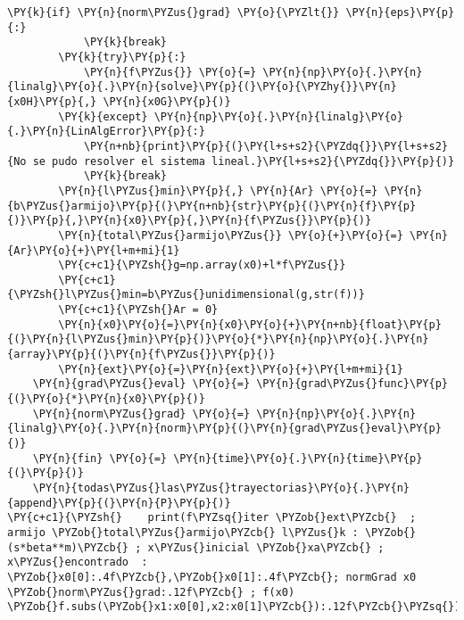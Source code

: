 \begin{itemize}
\begin{tcolorbox}[breakable, size=fbox, boxrule=1pt, pad at break*=1mm,colback=cellbackground, colframe=cellborder]
\begin{Verbatim}[commandchars=\\\{\}]
        \PY{k}{if} \PY{n}{norm\PYZus{}grad} \PY{o}{\PYZlt{}} \PY{n}{eps}\PY{p}{:}
            \PY{k}{break}
        \PY{k}{try}\PY{p}{:}
            \PY{n}{f\PYZus{}} \PY{o}{=} \PY{n}{np}\PY{o}{.}\PY{n}{linalg}\PY{o}{.}\PY{n}{solve}\PY{p}{(}\PY{o}{\PYZhy{}}\PY{n}{x0H}\PY{p}{,} \PY{n}{x0G}\PY{p}{)}
        \PY{k}{except} \PY{n}{np}\PY{o}{.}\PY{n}{linalg}\PY{o}{.}\PY{n}{LinAlgError}\PY{p}{:}
            \PY{n+nb}{print}\PY{p}{(}\PY{l+s+s2}{\PYZdq{}}\PY{l+s+s2}{No se pudo resolver el sistema lineal.}\PY{l+s+s2}{\PYZdq{}}\PY{p}{)}
            \PY{k}{break}
        \PY{n}{l\PYZus{}min}\PY{p}{,} \PY{n}{Ar} \PY{o}{=} \PY{n}{b\PYZus{}armijo}\PY{p}{(}\PY{n+nb}{str}\PY{p}{(}\PY{n}{f}\PY{p}{)}\PY{p}{,}\PY{n}{x0}\PY{p}{,}\PY{n}{f\PYZus{}}\PY{p}{)}
        \PY{n}{total\PYZus{}armijo\PYZus{}} \PY{o}{+}\PY{o}{=} \PY{n}{Ar}\PY{o}{+}\PY{l+m+mi}{1}
        \PY{c+c1}{\PYZsh{}g=np.array(x0)+l*f\PYZus{}}
        \PY{c+c1}{\PYZsh{}l\PYZus{}min=b\PYZus{}unidimensional(g,str(f))}
        \PY{c+c1}{\PYZsh{}Ar = 0}
        \PY{n}{x0}\PY{o}{=}\PY{n}{x0}\PY{o}{+}\PY{n+nb}{float}\PY{p}{(}\PY{n}{l\PYZus{}min}\PY{p}{)}\PY{o}{*}\PY{n}{np}\PY{o}{.}\PY{n}{array}\PY{p}{(}\PY{n}{f\PYZus{}}\PY{p}{)}
        \PY{n}{ext}\PY{o}{=}\PY{n}{ext}\PY{o}{+}\PY{l+m+mi}{1}
    \PY{n}{grad\PYZus{}eval} \PY{o}{=} \PY{n}{grad\PYZus{}func}\PY{p}{(}\PY{o}{*}\PY{n}{x0}\PY{p}{)}
    \PY{n}{norm\PYZus{}grad} \PY{o}{=} \PY{n}{np}\PY{o}{.}\PY{n}{linalg}\PY{o}{.}\PY{n}{norm}\PY{p}{(}\PY{n}{grad\PYZus{}eval}\PY{p}{)}
    \PY{n}{fin} \PY{o}{=} \PY{n}{time}\PY{o}{.}\PY{n}{time}\PY{p}{(}\PY{p}{)}
    \PY{n}{todas\PYZus{}las\PYZus{}trayectorias}\PY{o}{.}\PY{n}{append}\PY{p}{(}\PY{n}{P}\PY{p}{)}
\PY{c+c1}{\PYZsh{}    print(f\PYZsq{}iter \PYZob{}ext\PYZcb{}  ; armijo \PYZob{}total\PYZus{}armijo\PYZcb{} l\PYZus{}k : \PYZob{}(s*beta**m)\PYZcb{} ; x\PYZus{}inicial \PYZob{}xa\PYZcb{} ; x\PYZus{}encontrado  : \PYZob{}x0[0]:.4f\PYZcb{},\PYZob{}x0[1]:.4f\PYZcb{}; normGrad x0  \PYZob{}norm\PYZus{}grad:.12f\PYZcb{} ; f(x0) \PYZob{}f.subs(\PYZob{}x1:x0[0],x2:x0[1]\PYZcb{}):.12f\PYZcb{}\PYZsq{})}

\end{Verbatim}
\end{tcolorbox}
\end{itemize}
